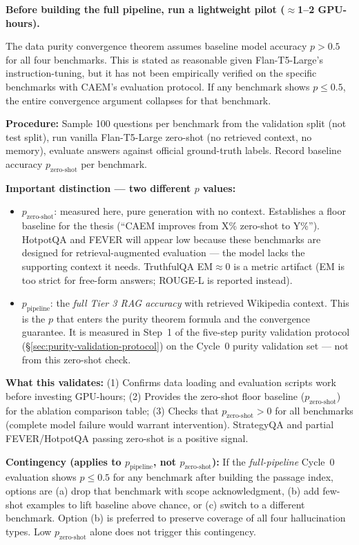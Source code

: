 \documentclass[12pt,a4paper]{article}
\theoremstyle{definition}
\begin{document}
\begin{keyinsightbox}
\textbf{Before building the full pipeline, run a lightweight pilot ($\approx$1--2 GPU-hours).}

The data purity convergence theorem assumes baseline model accuracy $p > 0.5$ for all four benchmarks. This is stated as reasonable given Flan-T5-Large's instruction-tuning, but it has not been empirically verified on the specific benchmarks with CAEM's evaluation protocol. If any benchmark shows $p \leq 0.5$, the entire convergence argument collapses for that benchmark.

\textbf{Procedure:} Sample 100 questions per benchmark from the validation split (not test split), run vanilla Flan-T5-Large zero-shot (no retrieved context, no memory), evaluate answers against official ground-truth labels. Record baseline accuracy $p_{\text{zero-shot}}$ per benchmark.

\textbf{Important distinction --- two different $p$ values:}
\begin{itemize}
    \item $p_{\text{zero-shot}}$: measured here, pure generation with no context. Establishes a floor baseline for the thesis (``CAEM improves from X\% zero-shot to Y\%''). HotpotQA and FEVER will appear low because these benchmarks are designed for retrieval-augmented evaluation --- the model lacks the supporting context it needs. TruthfulQA EM$\approx 0$ is a metric artifact (EM is too strict for free-form answers; ROUGE-L is reported instead).
    \item $p_{\text{pipeline}}$: the \emph{full Tier 3 RAG accuracy} with retrieved Wikipedia context. This is the $p$ that enters the purity theorem formula and the convergence guarantee. It is measured in Step~1 of the five-step purity validation protocol (\S\ref{sec:purity-validation-protocol}) on the Cycle~0 purity validation set --- not from this zero-shot check.
\end{itemize}

\textbf{What this validates:} (1) Confirms data loading and evaluation scripts work before investing GPU-hours; (2) Provides the zero-shot floor baseline ($p_{\text{zero-shot}}$) for the ablation comparison table; (3) Checks that $p_{\text{zero-shot}} > 0$ for all benchmarks (complete model failure would warrant intervention). StrategyQA and partial FEVER/HotpotQA passing zero-shot is a positive signal.

\textbf{Contingency (applies to $p_{\text{pipeline}}$, not $p_{\text{zero-shot}}$):} If the \emph{full-pipeline} Cycle~0 evaluation shows $p \leq 0.5$ for any benchmark after building the passage index, options are (a) drop that benchmark with scope acknowledgment, (b) add few-shot examples to lift baseline above chance, or (c) switch to a different benchmark. Option (b) is preferred to preserve coverage of all four hallucination types. Low $p_{\text{zero-shot}}$ alone does not trigger this contingency.
\end{keyinsightbox}
\end{document}

